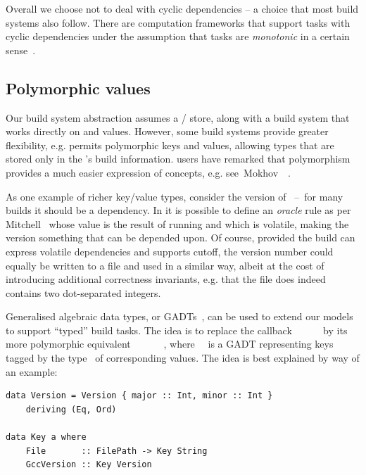 Overall we choose not to deal with cyclic dependencies -- a choice that most build
systems also follow. There are computation frameworks that support tasks with
cyclic dependencies under the assumption that tasks are \emph{monotonic} in a
certain sense~\cite{pottier2009lazy,radul2009propagation}.

\subsection{Polymorphic values}\label{sec-polymorphism}

Our build system abstraction assumes a / store, along with a build
system that works directly on  and  values. However, some build
systems provide greater flexibility, e.g. \Shake permits polymorphic keys and
values, allowing types that are stored only in the \Shake's build information.
\Shake users have remarked that polymorphism provides a much easier expression
of concepts, e.g. see~Mokhov~\etal~.

As one example of richer key/value types, consider the version of
~--~for many builds it should be a dependency. In \Shake it is possible
to define an \emph{oracle} rule as per Mitchell~
whose value is the result of running  and which is
volatile, making the  version something that can be depended upon. Of
course, provided the build can express volatile dependencies and supports
cutoff, the version number could equally be written to a file and used in a
similar way, albeit at the cost of introducing additional correctness
invariants, e.g. that the file  does indeed contains two
dot-separated integers.

Generalised algebraic data types, or GADTs~\cite{spj2006gadts}, can be used to
extend our models to support ``typed'' build tasks. The idea is to replace
the callback ~\hs{::}~~\hs{->}~~ by its
more polymorphic equivalent ~\hs{::}~~~\hs{->}~~,
where~~ is a GADT representing keys tagged by the type~ of
corresponding values. The idea is best explained by way of an example:

\vspace{1mm}
\begin{verbatim}
data Version = Version { major :: Int, minor :: Int }
    deriving (Eq, Ord)

data Key a where
    File       :: FilePath -> Key String
    GccVersion :: Key Version
\end{verbatim}
\vspace{1mm}

